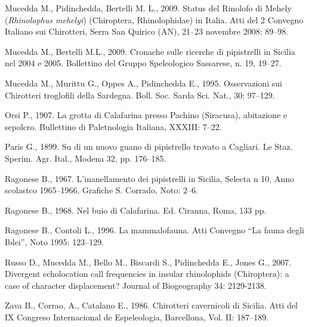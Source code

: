 \begin{multicols}{2}
\begin{small}
Mucedda M., Pidinchedda, Bertelli M. L., 2009. Status del Rinolofo di Mehely (\emph{Rhinolophus mehelyi}) (Chiroptera, Rhinolophidae) in Italia. Atti del 2\degree{} Convegno Italiano sui Chirotteri, Serra San Quirico (AN), 21--23 novembre 2008: 89--98.

Mucedda M., Bertelli M.L., 2009. Cronache sulle ricerche di pipistrelli in Sicilia nel 2004 e 2005. Bollettino del Gruppo Speleologico  Sassarese, n. 19, 19--27.

Mucedda M., Murittu G., Oppes A., Pidinchedda E., 1995. Osservazioni sui Chirotteri troglofili della Sardegna. Boll. Soc. Sarda Sci. Nat., 30: 97--129.

Orsi P., 1907. La grotta di Calafarina presso Pachino (Siracusa), abitazione e sepolcro. Bullettino di Paletnologia Italiana, XXXIII: 7--22.
 
Paris G., 1899. Su di un nuovo guano di pipistrello trovato a Cagliari. Le Staz. Sperim. Agr. Ital., Modena 32, pp. 176--185.

Ragonese B., 1967. L'inanellamento dei pipistrelli in Sicilia,  Selecta n 10, Anno scolastco 1965--1966, Grafiche S. Corrado, Noto: 2--6.

Ragonese B., 1968. Nel buio di Calafarina. Ed. Ciranna, Roma, 133 pp.

Ragonese B., Contoli L., 1996. La mammalofauna. Atti Convegno ``La fauna degli Iblei'', Noto 1995: 123--129.

Russo D., Mucedda M., Bello M., Biscardi S., Pidinchedda E., Jones G., 2007. Divergent echolocation call frequencies in insular rhinolophids (Chiroptera): a case of character displacement? Journal of Biogeography 34: 2129-2138.

Zava B., Corrao, A.,  Catalano E., 1986. Chirotteri cavernicoli di Sicilia. Atti del IX Congreso Internacional de Espeleologia, Barcellona, Vol. II: 187--189.
\end{small}

\end{multicols}
